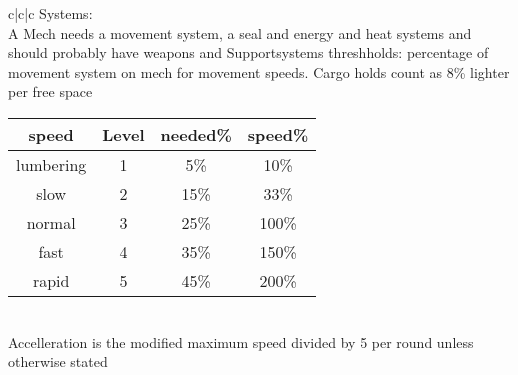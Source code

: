 \documentclass{article}
\begin{document}
\begin{tabular}{c|c|c}
    Systems:\\
    A Mech needs a movement system, a seal and energy and heat systems and should probably have weapons and Supportsystems\newline
    threshholds: percentage of movement system on mech for movement speeds. Cargo holds count as 8\% lighter per
    free space\newline
    \begin{tabular}{c|c|c|c}
        speed       &Level  &needed\%& speed\% \\\hline
        lumbering   &1      &5\%     &10\%\\
        slow        &2      &15\%    &33\%\\
        normal      &3      &25\%    &100\%\\
        fast        &4      &35\%    &150\%\\
        rapid       &5      &45\%    &200\%\\
    \end{tabular}\\
    Accelleration is the modified maximum speed divided by 5 per round unless otherwise stated


\end{tabular}
\end{document}
